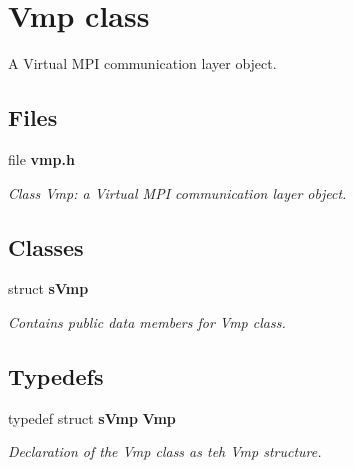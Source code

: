 \section{Vmp class}
\label{a00025}


A Virtual M\+P\+I communication layer object.  


\subsection*{Files}
\begin{DoxyCompactItemize}
\item 
file {\bf vmp.\+h}
\begin{DoxyCompactList}\small\item\em Class Vmp\+: a Virtual M\+P\+I communication layer object. \end{DoxyCompactList}\end{DoxyCompactItemize}
\subsection*{Classes}
\begin{DoxyCompactItemize}
\item 
struct {\bf s\+Vmp}
\begin{DoxyCompactList}\small\item\em Contains public data members for Vmp class. \end{DoxyCompactList}\end{DoxyCompactItemize}
\subsection*{Typedefs}
\begin{DoxyCompactItemize}
\item 
typedef struct {\bf s\+Vmp} {\bf Vmp}
\begin{DoxyCompactList}\small\item\em Declaration of the Vmp class as teh Vmp structure. \end{DoxyCompactList}\end{DoxyCompactItemize}
